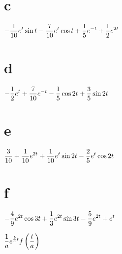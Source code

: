 \quad\;
\part{c} $\displaystyle{-\frac{1}{10}e^{t}\sin t-\frac{7}{10}e^{t}
\cos t+\frac{1}{5}e^{-t}+\frac{1}{2}e^{2t}}$\;
\part{d} $\displaystyle{-\frac{1}{2}e^{t}+\frac{7}{10}e^{-t}-\frac{1}{5}\cos2t+\frac{3}{5}\sin2t}$

\quad\;
\part{e} $\displaystyle{\frac{3}{10}+\frac{1}{10}e^{2t}+\frac{1}{10}e^{t}\sin
2t-\frac{2}{5}e^{t}\cos2t}$\;
\part{f} $\displaystyle{-\frac{4}{9}e^{2t}\cos3t+\frac{1}{3}
e^{2t}\sin3t-\frac{5}{9}e^{2t}+e^{t}}$

 $\displaystyle{\frac{1}{a}e^{\frac{b}{a}t}f\left(\frac{t}{a}\right)}$

